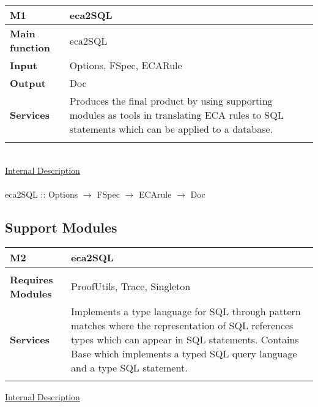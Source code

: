 \documentclass[12pt, svgnames]{article}
\begin{document}
{\setlength{\tabcolsep}{6pt} 
    \begin{tabularx}{\textwidth}{>{\bfseries}m{3cm}X}
        M1 & eca2SQL \\ 
        \midrule 
        Main function & eca2SQL
        \\  Input & Options, FSpec, ECARule
        \\  Output & Doc
        \\	Services & Produces the final product by using supporting modules 
        as tools in translating ECA rules to SQL statements which can be 
        applied to a database.
        \\     
         \vspace{12pt}
     \end{tabularx}
\\
\underline{Internal Description}\\ \\
eca2SQL :: Options $\rightarrow$ FSpec $\rightarrow$ ECArule $\rightarrow$ Doc

\subsection{Support Modules}

{\setlength{\tabcolsep}{6pt} 
    \begin{tabularx}{\textwidth}{>{\bfseries}m{4cm}X}
        M2 & eca2SQL \\ 
        \midrule       
        \\  Requires Modules & ProofUtils, Trace, Singleton
        \\	Services & Implements a type language for SQL through pattern 
        matches where the representation of SQL references types which can 
        appear in SQL statements. Contains Base which implements a typed SQL query 
        language and a type SQL statement.
        \\         
        \vspace{12pt}
    \end{tabularx} 

\setlength{\parindent}{0pt}
\underline{Internal Description}\\

}}
\end{document}
